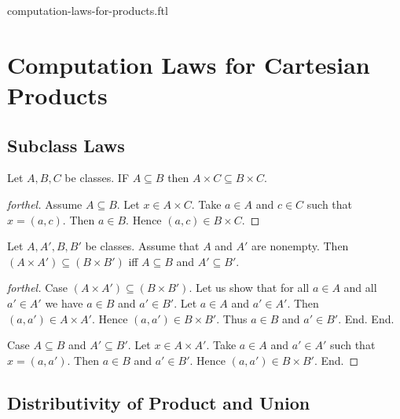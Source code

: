 \documentclass{naproche-library}
\begin{document}
\begin{smodule}{computation-laws-for-products.ftl}

  \section*{Computation Laws for Cartesian Products}

  \subsection*{Subclass Laws}

  \begin{proposition}[forthel,id=FOUNDATIONS_05_5719644021194752]
    Let $A, B, C$ be classes.
    IF $A \subseteq B$ then $A \times C \subseteq B \times C$.
  \end{proposition}
  \begin{proof}[forthel]
    Assume $A \subseteq B$.
    Let $x \in A \times C$.
    Take $a \in A$ and $c \in C$ such that $x = (a, c)$.
    Then $a \in B$.
    Hence $(a, c) \in B \times C$.
  \end{proof}

  \begin{proposition}[forthel,id=FOUNDATIONS_05_4888282951319552]
    Let $A, A', B, B'$ be classes.
    Assume that $A$ and $A'$ are nonempty.
    Then $(A \times A') \subseteq (B \times B')$ iff $A \subseteq B$ and $A' \subseteq B'$.
  \end{proposition}
  \begin{proof}[forthel]
    Case $(A \times A') \subseteq (B \times B')$.
      Let us show that for all $a \in A$ and all $a' \in A'$ we have $a \in B$ and $a' \in B'$.
        Let $a \in A$ and $a' \in A'$.
        Then $(a, a') \in A \times A'$.
        Hence $(a, a') \in B \times B'$.
        Thus $a \in B$ and $a' \in B'$.
      End.
    End.

    Case $A \subseteq B$ and $A' \subseteq B'$.
      Let $x \in A \times A'$.
      Take $a \in A$ and $a' \in A'$ such that $x = (a, a')$.
      Then $a \in B$ and $a' \in B'$.
      Hence $(a, a') \in B \times B'$.
    End.
  \end{proof}


  \subsection*{Distributivity of Product and Union}


\end{smodule}
\end{document}

